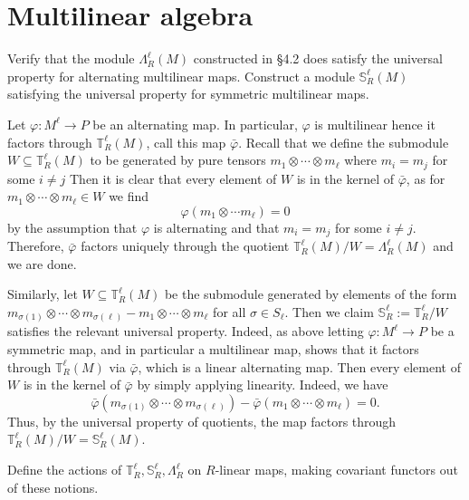 \documentclass[../../master.tex]{subfiles}
\begin{document}
\section{Multilinear algebra} 

\begin{problem}
    Verify that the module $\Lambda_R^{\ell}(M)$ constructed in \S 4.2 does satisfy the universal property for alternating multilinear maps.
    Construct a module $\mathbb{S}_R^{\ell}(M)$ satisfying the universal property for symmetric multilinear maps.
\end{problem}

\begin{solution}
    Let $\varphi : M^{\ell} \to P$ be an alternating map.
    In particular, $\varphi$ is multilinear hence it factors through $\mathbb{T}_R^{\ell}(M)$, call this map $\bar{\varphi}$.
    Recall that we define the submodule $W \subseteq \mathbb{T}_R^{\ell}(M)$ to be generated by pure tensors $m_1 \otimes \cdots \otimes m_\ell$ where $m_i = m_j$ for some $i \neq j$
    Then it is clear that every element of $W$ is in the kernel of $\bar{\varphi}$, as for $m_1 \otimes \cdots \otimes m_\ell \in W$ we find
    \[
    \varphi(m_1 \otimes \cdots m_{\ell}) = 0
    \]
    by the assumption that $\varphi$ is alternating and that $m_i = m_j$ for some $i \neq j$.
    Therefore, $\bar{\varphi}$ factors uniquely through the quotient $\mathbb{T}_R^{\ell}(M) / W = \Lambda_R^{\ell}(M)$ and we are done.

    Similarly, let $W \subseteq \mathbb{T}_R^{\ell}(M)$ be the submodule generated by elements of the form $m_{\sigma(1)} \otimes \cdots \otimes m_{\sigma(\ell)} - m_1 \otimes \cdots \otimes m_\ell$ for all $\sigma \in S_\ell$.
    Then we claim $\mathbb{S}_R^{\ell} := \mathbb{T}_R^{\ell} / W$ satisfies the relevant universal property.
    Indeed, as above letting $\varphi : M^{\ell} \to P$ be a symmetric map, and in particular a multilinear map, shows that it factors through $\mathbb{T}_R^{\ell}(M)$ via $\bar{\varphi}$, which is a linear alternating map.
    Then every element of $W$ is in the kernel of $\bar{\varphi}$ by simply applying linearity.
    Indeed, we have
    \[
    \bar{\varphi}(m_{\sigma(1)} \otimes \cdots \otimes m_{\sigma(\ell)}) - \bar{\varphi}(m_1 \otimes \cdots \otimes m_\ell) = 0.
    \]
    Thus, by the universal property of quotients, the map factors through $\mathbb{T}_R^{\ell}(M) / W = \mathbb{S}_R^{\ell}(M)$.
\end{solution}

\begin{problem}
    Define the actions of $\mathbb{T}_R^{\ell}, \mathbb{S}_R^{\ell}, \Lambda_R^{\ell}$ on $R$-linear maps, making covariant functors out of these notions.
\end{problem}
\end{document}
